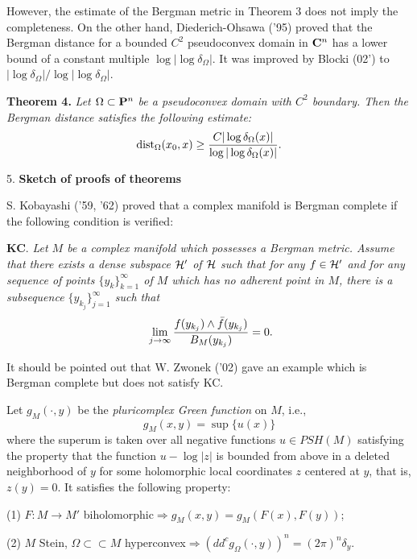 \documentclass[12pt]{article}
\begin{document}
\bigskip

However, the estimate of the Bergman metric in Theorem 3 does not
imply the completeness. On the other hand, Diederich-Ohsawa ('95)
proved that the Bergman distance for a bounded $C^2$ pseudoconvex
domain in ${\bf C}^n$ has a lower bound of a constant multiple
$\log|\log\delta_\Omega|$. It was improved by Blocki (02') to
$|\log \delta_\Omega|/\log|\log \delta_\Omega|$.

\bigskip

\textbf{Theorem 4.} \emph{Let $\Omega\subset {\bf P}^n$ be a
pseudoconvex domain with $C^2$ boundary. Then the Bergman distance
satisfies the following estimate:}
\[
{\rm dist}_\Omega (x_0,x)\ge \frac{C|\log\delta_\Omega(x)|}{\log
|\log \delta_\Omega (x)|}.
\]

\bigskip

5. \textbf{Sketch of proofs of theorems}

\bigskip

S. Kobayashi ('59, '62) proved that a complex manifold is Bergman
complete if the following condition is verified:

\bigskip

{\bf KC}. {\em Let $M$ be a complex manifold which
possesses a Bergman metric. Assume that there exists a dense subspace ${\cal %
H}^{\prime }$ of ${\cal H}$ such that for any $f\in {\cal
H}^{\prime }$ and for any sequence of points $\{y_k\}_{k=1}^\infty
$ of $M$ which has no adherent point in $M$, there is a
subsequence $\{y_{k_j}\}_{j=1}^\infty $ such that}
\[
\ \lim_{j\rightarrow \infty }\frac{f(y_{k_j})\wedge \bar f(y_{k_j})}{%
B_M(y_{k_j})}=0.
\]


\bigskip

It should be pointed out that W. Zwonek ('02) gave an example
which is Bergman complete but does not satisfy KC.

\bigskip

Let $g_M(\cdot,y)$ be the \emph{pluricomplex Green function} on
$M$, i.e.,
\[ g_M(x,y)=\sup \{u(x)\}
\]
where the superum is taken over all negative functions $u\in
PSH(M)$ satisfying the property that the function $u-\log |z|$ is
bounded from above in a deleted
neighborhood of $y$ for some holomorphic local coordinates $z$ centered at $%
y $, that is, $z(y)=0$. It satisfies the following property:

(1) $F:M\rightarrow M'$ biholomorphic$\Longrightarrow
g_M(x,y)=g_M(F(x),F(y))$;

(2) $M$ Stein, $\Omega\subset\subset M$
hyperconvex$\Longrightarrow (dd^c g_\Omega(\cdot,y))^n=(2\pi)^n
\delta_y$.
\end{document}
